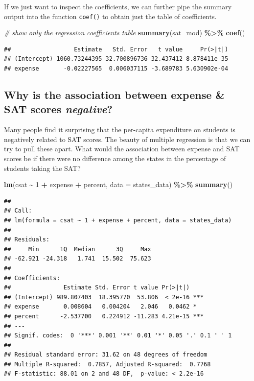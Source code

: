 \documentclass[
]{book}
\newenvironment{Shaded}{\begin{snugshade}}{\end{snugshade}}
\newcommand{\CommentTok}[1]{\textcolor[rgb]{0.56,0.35,0.01}{\textit{#1}}}
\newcommand{\DataTypeTok}[1]{\textcolor[rgb]{0.13,0.29,0.53}{#1}}
\newcommand{\DecValTok}[1]{\textcolor[rgb]{0.00,0.00,0.81}{#1}}
\newcommand{\KeywordTok}[1]{\textcolor[rgb]{0.13,0.29,0.53}{\textbf{#1}}}
\newcommand{\NormalTok}[1]{#1}
\newcommand{\OperatorTok}[1]{\textcolor[rgb]{0.81,0.36,0.00}{\textbf{#1}}}
\newcommand{\StringTok}[1]{\textcolor[rgb]{0.31,0.60,0.02}{#1}}
\begin{document}
If we just want to inspect the coefficients, we can further pipe the summary output into the function \texttt{coef()} to obtain just the table of coefficients.

\begin{Shaded}
\begin{Highlighting}[]
  \CommentTok{\# show only the regression coefficients table }
  \KeywordTok{summary}\NormalTok{(sat\_mod) }\OperatorTok{\%\textgreater{}\%}\StringTok{ }\KeywordTok{coef}\NormalTok{() }
\end{Highlighting}
\end{Shaded}

\begin{verbatim}
##                  Estimate   Std. Error   t value     Pr(>|t|)
## (Intercept) 1060.73244395 32.700896736 32.437412 8.878411e-35
## expense       -0.02227565  0.006037115 -3.689783 5.630902e-04
\end{verbatim}

\hypertarget{why-is-the-association-between-expense-sat-scores-negative}{%
\subsection{\texorpdfstring{Why is the association between expense \& SAT scores \emph{negative}?}{Why is the association between expense \& SAT scores negative?}}\label{why-is-the-association-between-expense-sat-scores-negative}}

Many people find it surprising that the per-capita expenditure on students is negatively related to SAT scores. The beauty of multiple regression is that we can try to pull these apart. What would the association between expense and SAT scores be if there were no difference among the states in the percentage of students taking the SAT?

\begin{Shaded}
\begin{Highlighting}[]
  \KeywordTok{lm}\NormalTok{(csat }\OperatorTok{\textasciitilde{}}\StringTok{ }\DecValTok{1} \OperatorTok{+}\StringTok{ }\NormalTok{expense }\OperatorTok{+}\StringTok{ }\NormalTok{percent, }\DataTypeTok{data =}\NormalTok{ states\_data) }\OperatorTok{\%\textgreater{}\%}\StringTok{ }
\StringTok{  }\KeywordTok{summary}\NormalTok{() }
\end{Highlighting}
\end{Shaded}

\begin{verbatim}
## 
## Call:
## lm(formula = csat ~ 1 + expense + percent, data = states_data)
## 
## Residuals:
##     Min      1Q  Median      3Q     Max 
## -62.921 -24.318   1.741  15.502  75.623 
## 
## Coefficients:
##               Estimate Std. Error t value Pr(>|t|)    
## (Intercept) 989.807403  18.395770  53.806  < 2e-16 ***
## expense       0.008604   0.004204   2.046   0.0462 *  
## percent      -2.537700   0.224912 -11.283 4.21e-15 ***
## ---
## Signif. codes:  0 '***' 0.001 '**' 0.01 '*' 0.05 '.' 0.1 ' ' 1
## 
## Residual standard error: 31.62 on 48 degrees of freedom
## Multiple R-squared:  0.7857, Adjusted R-squared:  0.7768 
## F-statistic: 88.01 on 2 and 48 DF,  p-value: < 2.2e-16
\end{verbatim}
\end{document}
